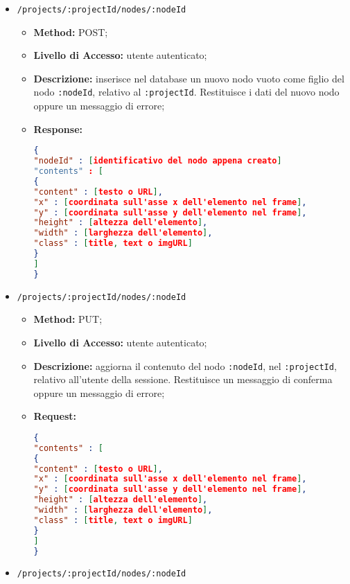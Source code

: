 \begin{itemize}
\begin{itemize}
\end{itemize}
\item \texttt{/projects/:projectId/nodes/:nodeId}
\begin{itemize}
\item \textbf{Method:} POST;
\item \textbf{Livello di Accesso:} utente autenticato;
\item \textbf{Descrizione:} inserisce nel database un nuovo nodo vuoto come figlio del nodo \texttt{:nodeId}, relativo al  \texttt{:projectId}. Restituisce i dati del nuovo nodo oppure un messaggio di errore;
\item \textbf{Response:}
\begin{lstlisting}[language=json,firstnumber=1]
{
"nodeId" : [identificativo del nodo appena creato]
"contents" : [
{
"content" : [testo o URL],
"x" : [coordinata sull'asse x dell'elemento nel frame],
"y" : [coordinata sull'asse y dell'elemento nel frame],
"height" : [altezza dell'elemento],
"width" : [larghezza dell'elemento],
"class" : [title, text o imgURL]
}
]
}
\end{lstlisting}
\end{itemize}
\item \texttt{/projects/:projectId/nodes/:nodeId}
\begin{itemize}
\item \textbf{Method:} PUT;
\item \textbf{Livello di Accesso:} utente autenticato;
\item \textbf{Descrizione:} aggiorna il contenuto del nodo \texttt{:nodeId}, nel  \texttt{:projectId}, relativo all'utente della sessione. Restituisce un messaggio di conferma oppure un messaggio di errore;
\item \textbf{Request:}
\begin{lstlisting}[language=json,firstnumber=1]
{
"contents" : [
{
"content" : [testo o URL],
"x" : [coordinata sull'asse x dell'elemento nel frame],
"y" : [coordinata sull'asse y dell'elemento nel frame],
"height" : [altezza dell'elemento],
"width" : [larghezza dell'elemento],
"class" : [title, text o imgURL]
}
]
}
\end{lstlisting}
\end{itemize}
\item \texttt{/projects/:projectId/nodes/:nodeId}
\begin{itemize}

\end{itemize}
\end{itemize}
